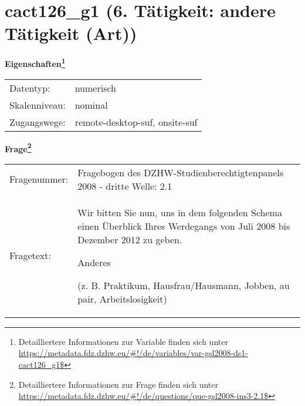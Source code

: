 
    \setcounter{footnote}{0}

    \vspace*{-1.8cm}
	\section{cact126\_g1 (6. Tätigkeit: andere Tätigkeit (Art))}
	\label{section:cact126_g1}



    \vspace*{0.5cm}
    \noindent\textbf{Eigenschaften\footnote{Detailliertere Informationen zur Variable finden sich unter
		\url{https://metadata.fdz.dzhw.eu/\#!/de/variables/var-gsl2008-ds1-cact126_g1$}}}\\
	\begin{tabularx}{\hsize}{@{}lX}
	Datentyp: & numerisch \\
	Skalenniveau: & nominal \\
	Zugangswege: &
	  remote-desktop-suf, 
	  onsite-suf
 \\
    \end{tabularx}



				\vspace*{0.5cm}
                \noindent\textbf{Frage\footnote{Detailliertere Informationen zur Frage finden sich unter
		              \url{https://metadata.fdz.dzhw.eu/\#!/de/questions/que-gsl2008-ins3-2.1$}}}\\
				\begin{tabularx}{\hsize}{@{}lX}
					Fragenummer: &
					  Fragebogen des DZHW-Studienberechtigtenpanels 2008 - dritte Welle:
					  2.1
 \\
					Fragetext: & Wir bitten Sie nun, uns in dem folgenden Schema einen Überblick Ihres Werdegangs von Juli 2008 bis Dezember 2012 zu geben.\par  Anderes\par  (z. B. Praktikum, Hausfrau/Hausmann, Jobben, au pair, Arbeitslosigkeit) \\
				\end{tabularx}





